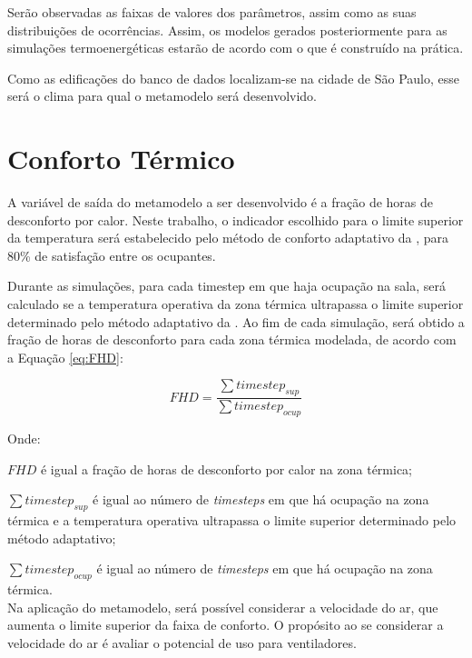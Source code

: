 \documentclass[brazil,hardcopy,openany,a5paper]{ufscthesis}
\begin{document}
		Serão observadas as faixas de valores dos parâmetros, assim como as suas distribuições de ocorrências. Assim, os modelos gerados posteriormente para as simulações termoenergéticas estarão de acordo com o que é construído na prática.
		
		Como as edificações do banco de dados localizam-se na cidade de São Paulo, esse será o clima para qual o metamodelo será desenvolvido.
		
		\section{Conforto Térmico}
		
		A variável de saída do metamodelo a ser desenvolvido é a fração de horas de desconforto por calor. Neste trabalho, o indicador escolhido para o limite superior da temperatura será estabelecido pelo método de conforto adaptativo da  \cite{ASHRAEStandard552017}, para 80\% de satisfação entre os ocupantes.

		Durante as simulações, para cada timestep em que haja ocupação na sala, será calculado se a temperatura operativa da zona térmica ultrapassa o limite superior determinado pelo método adaptativo da  \cite{ASHRAEStandard552017}. Ao fim de cada simulação, será obtido a fração de horas de desconforto para cada zona térmica modelada, de acordo com a Equação \ref{eq:FHD}:
		
		\begin{equation}
		\label{eq:FHD}
		FHD = \frac{\sum{timestep_{sup}}}{\sum{timestep_{ocup}}}
		\end{equation}
		
		Onde:
		
		$FHD$ é igual a fração de horas de desconforto por calor na zona térmica;
		
		$\sum{timestep_{sup}}$ é igual ao número de \textit{timesteps} em que há ocupação na zona térmica e a temperatura operativa ultrapassa o limite superior determinado pelo método adaptativo;
		
		$\sum{timestep_{ocup}}$ é igual ao número de \textit{timesteps} em que há ocupação na zona térmica.
		\\
		
		Na aplicação do metamodelo, será possível considerar a velocidade do ar, que aumenta o limite superior da faixa de conforto. O propósito ao se considerar a velocidade do ar é avaliar o potencial de uso para ventiladores.		
		
\end{document}
